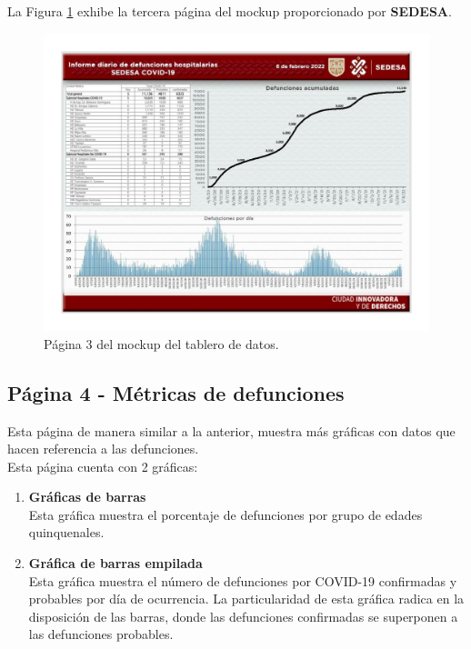 La Figura \ref{fig:mock_pag3} exhibe la tercera página del mockup proporcionado por \textbf{SEDESA}.

\begin{figure}[H]
        \centering
        \includegraphics[width=\textwidth]{images/mockup_3.jpg}
        \caption{Página 3 del mockup del tablero de datos.} \label{fig:mock_pag3}
\end{figure}

\subsection{Página 4 - Métricas de defunciones}

Esta página de manera similar a la anterior, muestra más gráficas con datos que hacen referencia a las defunciones.\\

Esta página cuenta con 2 gráficas:

\begin{enumerate}
    \item \textbf{Gráficas de barras}\\
    Esta gráfica muestra el porcentaje de defunciones por grupo de edades quinquenales. 

    \item \textbf{Gráfica de barras empilada}\\
    Esta gráfica muestra el número de defunciones por COVID-19 confirmadas y probables por día de ocurrencia. La particularidad de esta gráfica radica en la disposición de las barras, donde las defunciones confirmadas se superponen a las defunciones probables.
\end{enumerate}


